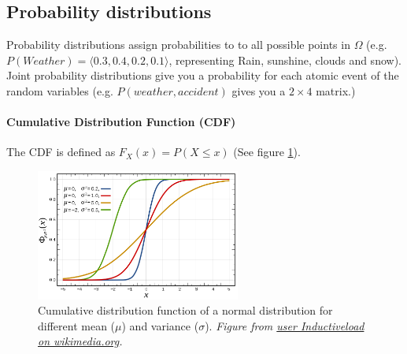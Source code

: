 \documentclass[../main.tex]{subfiles}
\begin{document}
\subsection{Probability distributions} 
Probability distributions assign probabilities to to all possible points in $\Omega$ (e.g. $P(Weather) = \langle 0.3, 0.4, 0.2, 0.1 \rangle$, representing Rain, sunshine, clouds and snow). 
Joint probability distributions give you a probability for each atomic event of the random variables (e.g. $P(weather, accident)$ gives you a $2\times 4$  matrix.)

\paragraph{Cumulative Distribution Function (CDF)}  The CDF is defined as $F_X(x) = P(X \leq x)$ (See figure \ref{CDF}).
        \begin{figure}
            \centering
            \includegraphics[width=0.6\textwidth]{../figures/Normal_Distribution_CDF.png}
            \caption{Cumulative distribution function of a normal distribution for different mean ($\mu$) and variance ($\sigma$). \textit{Figure from \href{https://commons.wikimedia.org/wiki/File:Normal_Distribution_CDF.svg}{user Inductiveload on wikimedia.org}.}}
            \label{CDF}
        \end{figure}
\end{document}
